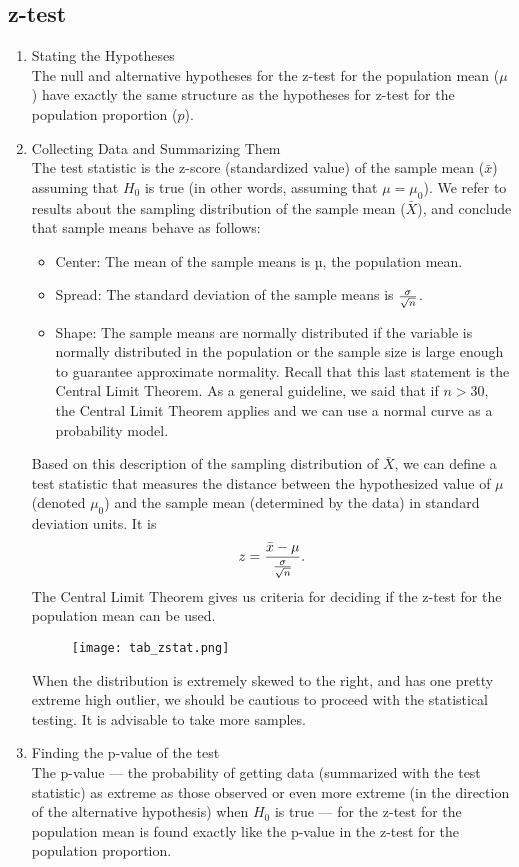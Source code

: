 \documentclass[10pt, a4paper]{article}
\begin{document}
\subsection{z-test}
\begin{enumerate}
\item Stating the Hypotheses\\
The null and alternative hypotheses for the z-test for the population mean ($\mu$) have exactly the same structure as the hypotheses for z-test for the population proportion ($p$).
\item Collecting Data and Summarizing Them\\
    The test statistic is the z-score (standardized value) of the sample mean ($\bar{x}$) assuming that $H_0$ is true (in other words, assuming that $\mu = \mu_0$). We refer to results about the sampling distribution of the sample mean ($\bar{X}$), and conclude that sample means behave as follows:
\begin{itemize}
\item Center: The mean of the sample means is µ, the population mean.
\item Spread: The standard deviation of the sample means is ${\sigma \over \sqrt{n}}$.
\item Shape: The sample means are normally distributed if the variable is normally distributed in the population or the sample size is large enough to guarantee approximate normality. Recall that this last statement is the Central Limit Theorem. As a general guideline, we said that if $n > 30$, the Central Limit Theorem applies and we can use a normal curve as a probability model.
\end{itemize}
Based on this description of the sampling distribution of $\bar{X}$, we can define a test statistic that measures the distance between the hypothesized value of $\mu$ (denoted $\mu_0$) and the sample mean (determined by the data) in standard deviation units. It is 
\[
    z = {{\bar{x}-\mu}\over {\sigma \over \sqrt{n}}}.
\]
The Central Limit Theorem gives us criteria for deciding if the z-test for the population mean can be used.\\
\begin{figure}
[h!]
\centering
\texttt{[image: tab\_zstat.png]}
\end{figure}
When the distribution is extremely skewed to the right, and has one pretty extreme high outlier, we should be cautious to proceed with the statistical testing. It is advisable to take more samples.
\item Finding the p-value of the test\\
The p-value — the probability of getting data (summarized with the test statistic) as extreme as those observed or even more extreme (in the direction of the alternative hypothesis) when $H_0$ is true — for the z-test for the population mean is found exactly like the p-value in the z-test for the population proportion.
\end{enumerate}
\end{document}
